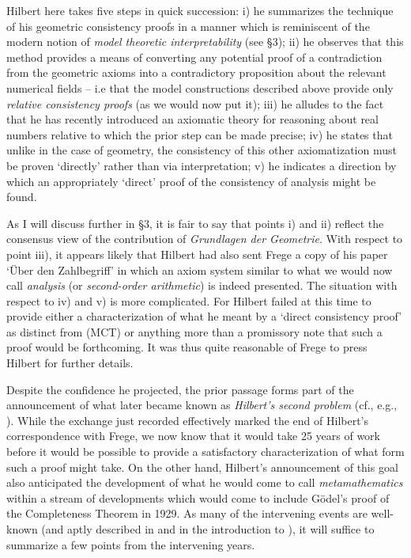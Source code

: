 \documentclass[11pt,fleqn,leqno]{article}
\begin{document}
Hilbert here takes five steps in quick succession: i) he summarizes the technique of his geometric consistency proofs in a manner which is  reminiscent of the modern notion of \textsl{model theoretic interpretability} (see \S 3);  ii) he observes that this method provides a means of converting any potential proof of a contradiction from the geometric axioms into a contradictory proposition about the relevant numerical fields -- i.e that the model constructions described above provide only \textsl{relative consistency proofs} (as we would now put it); iii) he alludes to the fact that he has recently introduced an axiomatic theory for reasoning about real numbers relative to which the prior step can be made precise;  iv) he states that unlike in the case of geometry, the consistency of this other axiomatization must be proven `directly' rather than via interpretation; v) he indicates a direction by which an appropriately `direct' proof of the consistency of analysis might be found.  

As I will discuss further in \S 3, it is fair to say that points i) and ii) reflect the consensus view of the contribution of \textsl{Grundlagen der Geometrie}.  With respect to point iii), it appears likely that Hilbert had also sent Frege a copy of his paper `\"Uber den Zahlbegriff' \citeyearpar{Hilbert1900a} in which an axiom system similar to what we would now call \textsl{analysis} (or \textsl{second-order arithmetic}) is indeed presented.  The situation with respect to iv) and v) is more complicated.  For Hilbert failed at this time to provide either a characterization of what he meant by a `direct consistency proof' as distinct from (MCT) or anything more than a promissory note that such a proof would be forthcoming.  It was thus quite reasonable of Frege to press Hilbert for further details.  

Despite the confidence he projected, the prior passage forms part of the announcement of what later became known as \textsl{Hilbert's second problem} (cf., e.g., \citealp{Kreisel1976}).   While the exchange just recorded effectively marked the end of Hilbert's correspondence with Frege, we now know that it would take 25 years of work before it would be possible to provide a satisfactory characterization of what form such a proof might take.   On the other hand, Hilbert's announcement of this goal also anticipated the development of what he would come to call \textsl{metamathematics}  within a stream of developments which would come to include G\"odel's proof of the Completeness Theorem in 1929.   As many of the intervening events are well-known (and aptly described in \citealp[I.3]{Sieg2013} and in the introduction to \citealp{Hilbert2013}), it will suffice to summarize a few points from the intervening years.  
\end{document}
